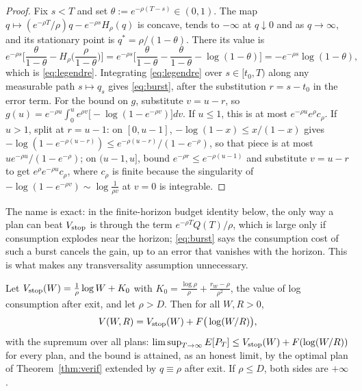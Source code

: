 \begin{proof}
Fix $s<T$ and set $\theta:=e^{-\rho(T-s)}\in(0,1)$. The map $q\mapsto(e^{-\rho T}/\rho)q-e^{-\rho s}H_\rho(q)$ is concave, tends to $-\infty$ at $q\downarrow0$ and as $q\to\infty$, and its stationary point is $q^*=\rho/(1-\theta)$. There its value is
\[
e^{-\rho s}\Big[\frac{\theta}{1-\theta}-H_\rho\Big(\frac{\rho}{1-\theta}\Big)\Big]
=e^{-\rho s}\Big[\frac{\theta}{1-\theta}-\frac{\theta}{1-\theta}-\log(1-\theta)\Big]=-e^{-\rho s}\log(1-\theta),
\]
which is \eqref{eq:legendre}. Integrating \eqref{eq:legendre} over $s\in[t_0,T)$ along any measurable path $s\mapsto q_s$ gives \eqref{eq:burst}, after the substitution $r=s-t_0$ in the error term. For the bound on $g$, substitute $v=u-r$, so $g(u)=e^{-\rho u}\int_0^u e^{\rho v}\big[-\log(1-e^{-\rho v})\big]dv$. If $u\le1$, this is at most $e^{-\rho u}e^{\rho}c_\rho$. If $u>1$, split at $r=u-1$: on $[0,u-1]$, $-\log(1-x)\le x/(1-x)$ gives $-\log(1-e^{-\rho(u-r)})\le e^{-\rho(u-r)}/(1-e^{-\rho})$, so that piece is at most $ue^{-\rho u}/(1-e^{-\rho})$; on $(u-1,u]$, bound $e^{-\rho r}\le e^{-\rho(u-1)}$ and substitute $v=u-r$ to get $e^{\rho}e^{-\rho u}c_\rho$, where $c_\rho$ is finite because the singularity of $-\log(1-e^{-\rho v})\sim\log\frac1{\rho v}$ at $v=0$ is integrable.
\end{proof}

The name is exact: in the finite-horizon budget identity below, the only way a plan can beat $V_{\rm stop}$ is through the term $e^{-\rho T}Q(T)/\rho$, which is large only if consumption explodes near the horizon; \eqref{eq:burst} says the consumption cost of such a burst cancels the gain, up to an error that vanishes with the horizon. This is what makes any transversality assumption unnecessary.

\begin{alemma}[Reduction]\label{lem:reduction}
Let $V_{\rm stop}(W)=\frac1\rho\log W+K_0$ with $K_0=\frac{\log\rho}{\rho}+\frac{r_W-\rho}{\rho^2}$, the value of log consumption after exit, and let $\rho>D$. Then for all $W,R>0$,
\[
V(W,R)=V_{\rm stop}(W)+F\big(\log(W/R)\big),
\]
with the supremum over all plans: $\limsup_{T\to\infty}E[P_T]\le V_{\rm stop}(W)+F(\log(W/R))$ for every plan, and the bound is attained, as an honest limit, by the optimal plan of Theorem~\ref{thm:verif} extended by $q\equiv\rho$ after exit. If $\rho\le D$, both sides are $+\infty$.
\end{alemma}

